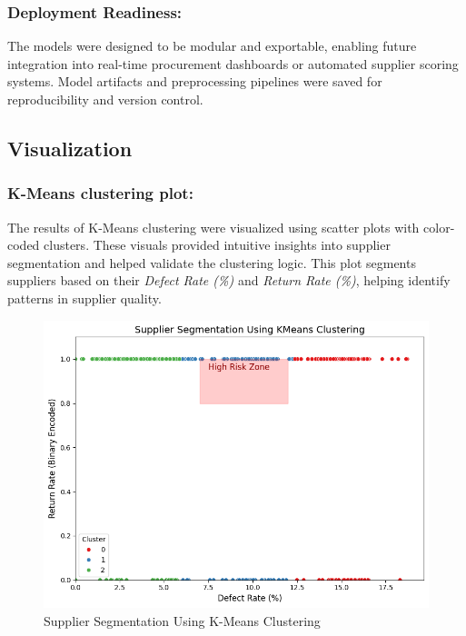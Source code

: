 \documentclass[10pt, twocolumn]{article}
\begin{document}
\subsubsection{Deployment Readiness:} The models were designed to be modular and exportable, enabling future integration into real-time procurement dashboards or automated supplier scoring systems. Model artifacts and preprocessing pipelines were saved for reproducibility and version control.


\subsection{Visualization}

\subsubsection{K-Means clustering plot:} 
 The results of K-Means clustering were visualized using scatter plots with color-coded clusters. These visuals provided intuitive insights into supplier segmentation and helped validate the clustering logic.
 This plot segments suppliers based on their \textit{Defect Rate (\%)} and \textit{Return Rate (\%)}, helping identify patterns in supplier quality.
 
 \begin{figure}[H]
    \centering
    \includegraphics[width=1\linewidth]{Images/supplier_segmentation_KMeans_clustering.png}
    \caption{Supplier Segmentation Using K-Means Clustering}
    \label{fig:supplier_segmentation_KMeans_clustering}
\end{figure}
\end{document}
